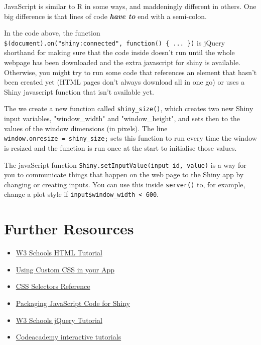 \documentclass[
  oneside]{book}
\newcommand{\StringTok}[1]{\textcolor[rgb]{0.31,0.60,0.02}{#1}}
\providecommand{\tightlist}{%
  \setlength{\itemsep}{0pt}\setlength{\parskip}{0pt}}
\begin{document}
JavaScript is similar to R in some ways, and maddeningly different in others. One big difference is that lines of code \textbf{\emph{have to}} end with a semi-colon.

In the code above, the function \texttt{\$(document).on("shiny:connected",\ function()\ \{\ ...\ \})} is jQuery shorthand for making sure that the code inside doesn't run until the whole webpage has been downloaded and the extra javascript for shiny is available. Otherwise, you might try to run some code that references an element that hasn't been created yet (HTML pages don't always download all in one go) or uses a Shiny javascript function that isn't available yet.

The we create a new function called \texttt{shiny\_size}\texttt{()}, which creates two new Shiny input variables, \StringTok{"window\_width"} and \StringTok{"window\_height"}, and sets then to the values of the window dimensions (in pixels). The line \texttt{window.onresize\ =\ shiny\_size;} sets this function to run every time the window is resized and the function is run once at the start to initialise those values.

The javaScript function \texttt{Shiny.setInputValue(input\_id,\ value)} is a way for you to communicate things that happen on the web page to the Shiny app by changing or creating inputs. You can use this inside \texttt{server}\texttt{()} to, for example, change a plot style if \texttt{input\$window\_width\ \textless{}\ 600}.

\hypertarget{resources-web}{%
\section{Further Resources}\label{resources-web}}

\begin{itemize}
\tightlist
\item
  \href{https://www.w3schools.com/html/}{W3 Schools HTML Tutorial}
\item
  \href{https://shiny.rstudio.com/articles/css.html}{Using Custom CSS in your App}
\item
  \href{https://www.w3schools.com/cssref/css_selectors.asp}{CSS Selectors Reference}
\item
  \href{https://shiny.rstudio.com/articles/packaging-javascript.html}{Packaging JavaScript Code for Shiny}
\item
  \href{https://www.w3schools.com/jquERy/default.asp}{W3 Schools jQuery Tutorial}
\item
  \href{https://www.codecademy.com/en/tracks/htmlcss}{Codeacademy interactive tutorials}
\end{itemize}
\end{document}
